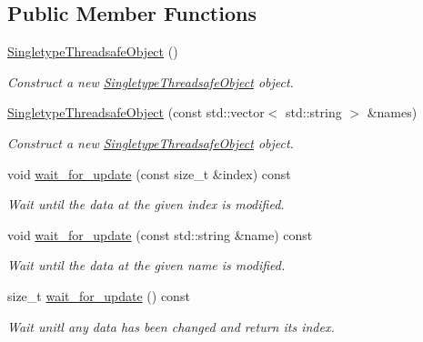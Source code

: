 \subsection*{Public Member Functions}
\begin{DoxyCompactItemize}
\item 
\mbox{\label{classreal__time__tools_1_1SingletypeThreadsafeObject_a00771da99b515b82cd0b10a431b4ccb1}} 
\hyperlink{classreal__time__tools_1_1SingletypeThreadsafeObject_a00771da99b515b82cd0b10a431b4ccb1}{Singletype\+Threadsafe\+Object} ()
\begin{DoxyCompactList}\small\item\em Construct a new \hyperlink{classreal__time__tools_1_1SingletypeThreadsafeObject}{Singletype\+Threadsafe\+Object} object. \end{DoxyCompactList}\item 
\hyperlink{classreal__time__tools_1_1SingletypeThreadsafeObject_ad33b8afc1581cc7adea5881c9d775128}{Singletype\+Threadsafe\+Object} (const std\+::vector$<$ std\+::string $>$ \&names)
\begin{DoxyCompactList}\small\item\em Construct a new \hyperlink{classreal__time__tools_1_1SingletypeThreadsafeObject}{Singletype\+Threadsafe\+Object} object. \end{DoxyCompactList}\item 
void \hyperlink{classreal__time__tools_1_1SingletypeThreadsafeObject_ac105db0216c21d2bf7cb0f2465857aeb}{wait\+\_\+for\+\_\+update} (const size\+\_\+t \&index) const
\begin{DoxyCompactList}\small\item\em Wait until the data at the given index is modified. \end{DoxyCompactList}\item 
void \hyperlink{classreal__time__tools_1_1SingletypeThreadsafeObject_ab97c9e8f26f6a9a3c67bd59842bad4b2}{wait\+\_\+for\+\_\+update} (const std\+::string \&name) const
\begin{DoxyCompactList}\small\item\em Wait until the data at the given name is modified. \end{DoxyCompactList}\item 
size\+\_\+t \hyperlink{classreal__time__tools_1_1SingletypeThreadsafeObject_a4d77aeca1b3789cc97f49ff2dd4c6562}{wait\+\_\+for\+\_\+update} () const
\begin{DoxyCompactList}\small\item\em Wait unitl any data has been changed and return its index. \end{DoxyCompactList}\item 

\end{DoxyCompactItemize}
